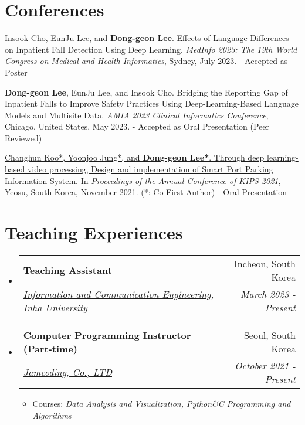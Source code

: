 \documentclass[letterpaper,11pt]{article}
\makeatletter
\newcommand{\resumeSubheading}[4]{
  \vspace{-1pt}\item
    \begin{tabular*}{0.97\textwidth}{l@{\extracolsep{\fill}}r}
      \textbf{#1} & #2 \\
      \textit{\small#3} & \textit{\small #4} \\
    \end{tabular*}\vspace{-5pt}
}
\makeatother
\begin{document}
    \section{Conferences}
    \begin{enumerate}[noitemsep, leftmargin=*,label={[\arabic*]}]
        \item {Insook Cho, EunJu Lee, and \textbf{Dong-geon Lee}. Effects of Language Differences on Inpatient Fall Detection Using Deep Learning. \textit{MedInfo 2023: The 19th World Congress on Medical and Health Informatics}, Sydney, July 2023. - Accepted as Poster}
        
        \item {\textbf{Dong-geon Lee}, EunJu Lee, and Insook Cho. Bridging the Reporting Gap of Inpatient Falls to Improve Safety Practices Using Deep-Learning-Based Language Models and Multisite Data. \textit{AMIA 2023 Clinical Informatics Conference}, Chicago, United States, May 2023. - Accepted as Oral Presentation (Peer Reviewed)}
        
        \item {\href{https://doi.org/10.3745/PKIPS.y2021m11a.1342}{Changhun Koo*, Yoonjoo Jung*, and \textbf{Dong-geon Lee*}. Through deep learning-based video processing, Design and implementation of Smart Port Parking Information System. In \textit{Proceedings of the Annual Conference of KIPS 2021}, Yeosu, South Korea, November 2021. (*: Co-First Author) - Oral Presentation}}
    \end{enumerate}
    
    \section{Teaching Experiences}
    \begin{itemize}[leftmargin=*,label=]
        \resumeSubheading
        {Teaching Assistant}{Incheon, South Korea}
            {\href{http://bit.ly/3Uu4LTi}{Information and Communication Engineering}, \href{https://eng.inha.ac.kr/eng/index.do}{Inha University}}{March 2023 - Present}
            \begin{itemize}[label={\bullet}]
                \item{Courses: \textit{Algorithm Capstone Design, Introduction to AI Programming}
            \end{itemize}
        \resumeSubheading
        {Computer Programming Instructor (Part-time)}{Seoul, South Korea}
            {\href{https://jamcoding.co.kr/}{Jamcoding, Co., LTD}}{October 2021 - Present}
            \begin{itemize}[label=\bullet]
                \item{Courses: \textit{Data Analysis and Visualization, Python\&C Programming and Algorithms}}
            \end{itemize}
    \end{itemize}
\end{document}
